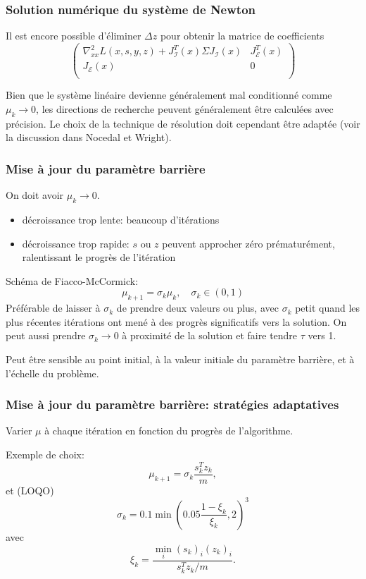 \documentclass[usepdftitle=false]{beamer}
\def\cE{\mathcal{E}}
\def\cI{\mathcal{I}}
\begin{document}
\begin{frame}
\frametitle{Solution numérique du système de Newton}

Il est encore possible d'éliminer $\Delta z$ pour obtenir la matrice de coefficients
$$
	\begin{pmatrix}
\nabla^2_{xx} L(x,s,y,z) + J^T_{\cI}(x) \Sigma J_{\cI}(x)&  J^T_{\cE}(x) \\
J_{\cE}(x) & 0\\
\end{pmatrix}
$$

\mbox{}

Bien que le système linéaire devienne généralement mal conditionné comme $\mu_k \rightarrow 0$, les directions de recherche peuvent généralement être calculées avec précision. Le choix de la technique de résolution doit cependant être adaptée (voir la discussion dans Nocedal et Wright).

\end{frame}

\begin{frame}
\frametitle{Mise à jour du paramètre barrière}

On doit avoir $\mu_k \rightarrow 0$.
\begin{itemize}
	\item décroissance trop lente: beaucoup d'itérations
	\item décroissance trop rapide: $s$ ou $z$ peuvent approcher zéro prématurément, ralentissant le progrès de l'itération
\end{itemize}

\mbox{}

Schéma de Fiacco-McCormick:
$$
\mu_{k+1} = \sigma_k\mu_k, \quad \sigma_k \in (0,1)
$$
Préférable de laisser à $\sigma_k$ de prendre deux valeurs ou plus, avec $\sigma_k$ petit quand les plus récentes itérations ont mené à des progrès significatifs vers la solution.
On peut aussi prendre $\sigma_k \rightarrow 0$ à proximité de la solution et faire tendre $\tau$ vers 1.

\mbox{}

Peut être sensible au point initial, à la valeur initiale du paramètre barrière, et à l'échelle du problème.

\end{frame}

\begin{frame}
\frametitle{Mise à jour du paramètre barrière: stratégies adaptatives}

Varier $\mu$ à chaque itération en fonction du progrès de l'algorithme.

\mbox{}

Exemple de choix:
$$
\mu_{k+1} = \sigma_k \frac{s_k^Tz_k}{m},
$$
et (LOQO)
$$
\sigma_k = 0.1 \min \left( 0.05 \frac{1-\xi_k}{\xi_k}, 2\right)^3
$$
avec
$$
\xi_k = \frac{\min_i (s_k)_i(z_k)_i}{s_k^Tz_k/m}.
$$
\end{frame}
\end{document}

